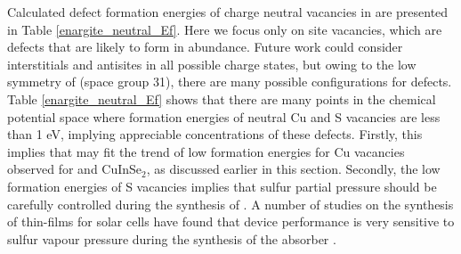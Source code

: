 \documentclass[11pt, twoside]{report}
\begin{document}
Calculated defect formation energies of charge neutral vacancies in {\enargite} are presented in Table \ref{enargite_neutral_Ef}. 
Here we focus only on site vacancies, which are defects that are likely to form in abundance. Future work could consider interstitials and antisites in all possible charge states, but owing to the low symmetry of {\enargite} (space group 31), there are many possible configurations for defects.
Table \ref{enargite_neutral_Ef} shows that there are many points in the chemical potential space where formation energies of neutral Cu and S vacancies are less than 1 eV, implying appreciable concentrations of these defects. Firstly, this implies that {\enargite} may fit the trend of low formation energies for Cu vacancies observed for {\CZTS} and CuInSe$_2$, as discussed earlier in this section. Secondly, the low formation energies of S vacancies implies that sulfur partial pressure should be carefully controlled during the synthesis of {\enargite}. A number of studies on the synthesis of {\CZTS} thin-films for solar cells have found that device performance is very sensitive to sulfur vapour pressure during the synthesis of the absorber \cite{CZTS_S_pressure1, CZTS_S_pressure2, CZTS_S_pressure3}.



\end{document}
